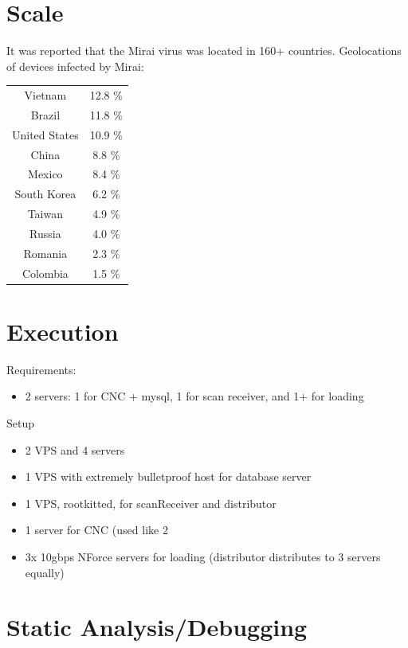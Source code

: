 \documentclass[12pt, letterpaper]{article}
\begin{document}
\begin{sloppypar}
\begin{flushleft}
\section*{Scale}
It was reported that the Mirai virus was located in 160+ countries.
Geolocations of devices infected by Mirai:
\begin{center}
\begin{tabular}{c c}
Vietnam	& 12.8 \%\\
Brazil & 11.8 \%\\
United States & 10.9 \%\\
China & 8.8 \%\\
Mexico & 8.4 \%\\
South Korea	& 6.2 \%\\
Taiwan & 4.9 \%\\
Russia & 4.0 \%\\
Romania	& 2.3 \%\\
Colombia	 & 1.5 \%\\
\end{tabular}
\end{center}



\section*{Execution}

Requirements: \\
\begin{itemize}
\item 2 servers: 1 for CNC + mysql, 1 for scan receiver, and 1+ for loading
\end{itemize}

Setup
\begin{itemize}
\item 2 VPS and 4 servers
\item 1 VPS with extremely bulletproof host for database server
\item 1 VPS, rootkitted, for scanReceiver and distributor
\item 1 server for CNC (used like 2%
\item 3x 10gbps NForce servers for loading (distributor distributes to 3 servers equally)
\end{itemize}



\section*{Static Analysis/Debugging}



\end{flushleft}
\end{sloppypar}
\end{document}
